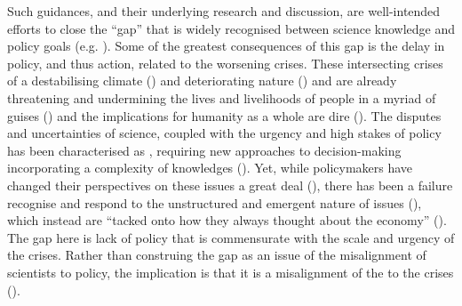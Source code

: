 Such guidances, and their underlying research and discussion, are well-intended efforts to close the ``gap'' that is widely recognised between science knowledge and policy goals (e.g. \cite{RapleyD2014,KarlssonG2020,CairneyTS2023}). Some of the greatest consequences of this gap is the delay in policy, and thus action, related to the worsening \CAN{} crises. These intersecting crises of a destabilising climate (\cite{IIPCC2022}) and deteriorating nature (\cite{IPBES2022}) and are already threatening and undermining the lives and livelihoods of people in a myriad of guises (\cite{TschakertEAKO2019,SpaiserEtAl2024}) and the implications for humanity as a whole are dire (\cite{McKayEtAl2022,WEF2024,SpaiserEtAl2024}). The disputes and uncertainties of \CAN{} science, coupled with the urgency and high stakes of \CAN{} policy has been characterised as \PNS, requiring new approaches to decision-making incorporating a complexity of knowledges (\cite{FuntowiczR1993,Ravetz1999}). Yet, while policymakers have changed their perspectives on these issues a great deal (\cite[p118]{Killick2023}), there has been a failure recognise and respond to the unstructured and emergent nature of \CAN{} issues (\cite{FuntowiczR1993,WesselinkH2020}), which instead are ``tacked onto how they always thought about the economy'' (\cite[p118]{Killick2023}). The gap here is lack of policy that is commensurate with the scale and urgency of the \CAN{} crises. Rather than construing the gap as an issue of the misalignment of scientists to policy, the implication is that it is a misalignment of the \SPI{} to the \CAN{} crises (\cite{BalvaneraJNOBCDGGKKMPSSW2020}).


